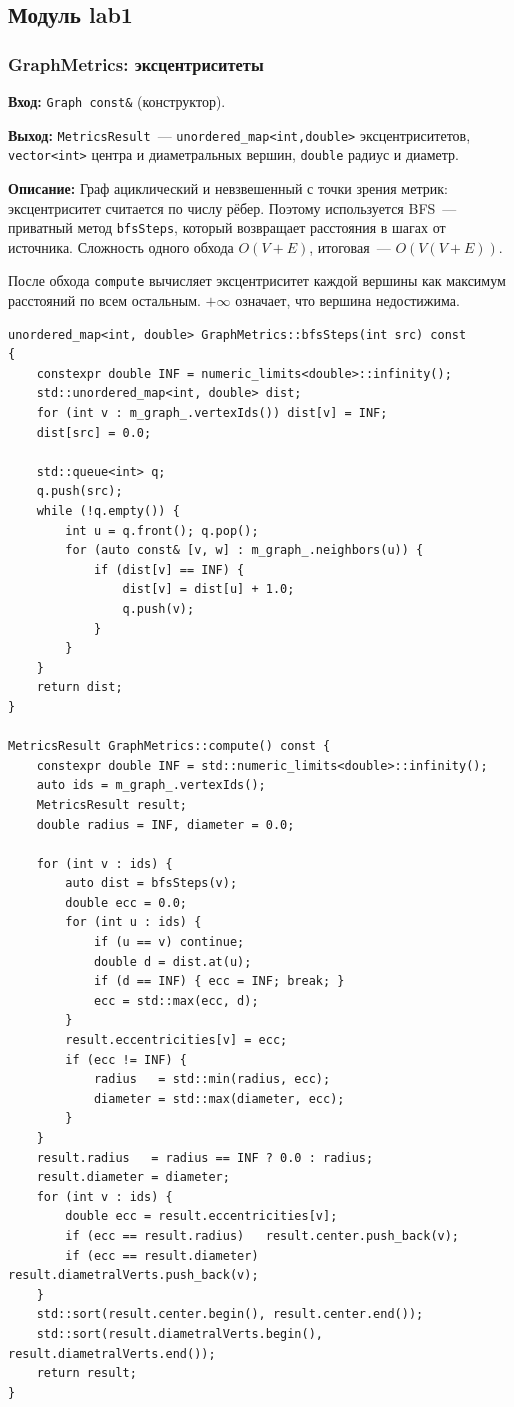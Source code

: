 \subsection{Модуль lab1}

\subsubsection{GraphMetrics: эксцентриситеты}

\textbf{Вход:} \texttt{Graph const\&} (конструктор).

\textbf{Выход:} \texttt{MetricsResult}~--- \texttt{unordered\_map<int,double>}
эксцентриситетов, \texttt{vector<int>} центра и диаметральных вершин,
\texttt{double} радиус и диаметр.

\textbf{Описание:} Граф ациклический и невзвешенный с точки зрения метрик:
эксцентриситет считается по числу рёбер. Поэтому  используется BFS~--- приватный метод \texttt{bfsSteps},
который возвращает расстояния в шагах от источника. Сложность одного
обхода $O(V + E)$, итоговая~--- $O(V(V+E))$.

После обхода \texttt{compute} вычисляет эксцентриситет каждой вершины
как максимум расстояний по всем остальным. $+\infty$ означает, что
вершина недостижима.

\begin{lstlisting}[style=cppstyle, caption={BFS и вычисление метрик (GraphMetrics.cc)}]
unordered_map<int, double> GraphMetrics::bfsSteps(int src) const
{
    constexpr double INF = numeric_limits<double>::infinity();
    std::unordered_map<int, double> dist;
    for (int v : m_graph_.vertexIds()) dist[v] = INF;
    dist[src] = 0.0;

    std::queue<int> q;
    q.push(src);
    while (!q.empty()) {
        int u = q.front(); q.pop();
        for (auto const& [v, w] : m_graph_.neighbors(u)) {
            if (dist[v] == INF) {
                dist[v] = dist[u] + 1.0;
                q.push(v);
            }
        }
    }
    return dist;
}

MetricsResult GraphMetrics::compute() const {
    constexpr double INF = std::numeric_limits<double>::infinity();
    auto ids = m_graph_.vertexIds();
    MetricsResult result;
    double radius = INF, diameter = 0.0;

    for (int v : ids) {
        auto dist = bfsSteps(v);
        double ecc = 0.0;
        for (int u : ids) {
            if (u == v) continue;
            double d = dist.at(u);
            if (d == INF) { ecc = INF; break; }
            ecc = std::max(ecc, d);
        }
        result.eccentricities[v] = ecc;
        if (ecc != INF) {
            radius   = std::min(radius, ecc);
            diameter = std::max(diameter, ecc);
        }
    }
    result.radius   = radius == INF ? 0.0 : radius;
    result.diameter = diameter;
    for (int v : ids) {
        double ecc = result.eccentricities[v];
        if (ecc == result.radius)   result.center.push_back(v);
        if (ecc == result.diameter) result.diametralVerts.push_back(v);
    }
    std::sort(result.center.begin(), result.center.end());
    std::sort(result.diametralVerts.begin(), result.diametralVerts.end());
    return result;
}
\end{lstlisting}


